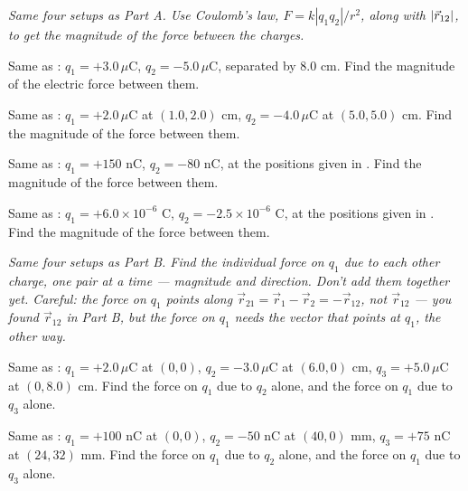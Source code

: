\documentclass[12pt]{article}
\begin{document}

\clearpage

\textit{Same four setups as Part A. Use Coulomb's law, $F=k|q_1q_2|/r^2$, along with $|\vec{r}_{12}|$, to get the magnitude of the force between the charges.}

\prob Same as : $q_1=+3.0\,\mu\text{C}$, $q_2=-5.0\,\mu\text{C}$, separated by 8.0 cm. Find the magnitude of the electric force between them.


\prob Same as : $q_1=+2.0\,\mu\text{C}$ at $(1.0,2.0)$ cm, $q_2=-4.0\,\mu\text{C}$ at $(5.0,5.0)$ cm. Find the magnitude of the force between them.


\prob Same as : $q_1=+150$ nC, $q_2=-80$ nC, at the positions given in . Find the magnitude of the force between them.


\prob Same as : $q_1=+6.0\times10^{-6}$ C, $q_2=-2.5\times10^{-6}$ C, at the positions given in . Find the magnitude of the force between them.


\clearpage

\textit{Same four setups as Part B. Find the individual force on $q_1$ due to each other charge, one pair at a time --- magnitude and direction. Don't add them together yet. Careful: the force on $q_1$ points along $\vec{r}_{21}=\vec{r}_1-\vec{r}_2=-\vec{r}_{12}$, not $\vec{r}_{12}$ --- you found $\vec{r}_{12}$ in Part B, but the force on $q_1$ needs the vector that points \emph{at} $q_1$, the other way.}

\prob Same as : $q_1=+2.0\,\mu\text{C}$ at $(0,0)$, $q_2=-3.0\,\mu\text{C}$ at $(6.0,0)$ cm, $q_3=+5.0\,\mu\text{C}$ at $(0,8.0)$ cm. Find the force on $q_1$ due to $q_2$ alone, and the force on $q_1$ due to $q_3$ alone.


\prob Same as : $q_1=+100$ nC at $(0,0)$, $q_2=-50$ nC at $(40,0)$ mm, $q_3=+75$ nC at $(24,32)$ mm. Find the force on $q_1$ due to $q_2$ alone, and the force on $q_1$ due to $q_3$ alone.

\end{document}
